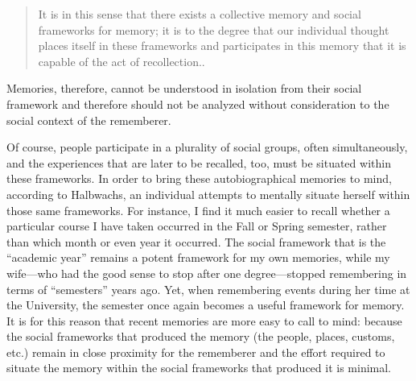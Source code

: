 \begin{quote}
It is in this sense that there exists a collective memory and social
frameworks for memory; it is to the degree that our individual thought
places itself in these frameworks and participates in this memory that
it is capable of the act of recollection.\autocite[38]{halbwachs1992}.
\end{quote}

Memories, therefore, cannot be understood in isolation from their social
framework and therefore should not be analyzed without consideration to
the social context of the rememberer.

Of course, people participate in a plurality of social groups, often
simultaneously, and the experiences that are later to be recalled, too,
must be situated within these frameworks. In order to bring these
autobiographical memories to mind, according to Halbwachs, an individual
attempts to mentally situate herself within those same frameworks. For
instance, I find it much easier to recall whether a particular course I
have taken occurred in the Fall or Spring semester, rather than which
month or even year it occurred. The social framework that is the
``academic year'' remains a potent framework for my own memories, while
my wife---who had the good sense to stop after one degree---stopped
remembering in terms of ``semesters'' years ago. Yet, when remembering
events during her time at the University, the semester once again
becomes a useful framework for memory. It is for this reason that recent
memories are more easy to call to mind: because the social frameworks
that produced the memory (the people, places, customs, etc.) remain in
close proximity for the rememberer and the effort required to situate
the memory within the social frameworks that produced it is
minimal.\autocite[52]{halbwachs1992}

